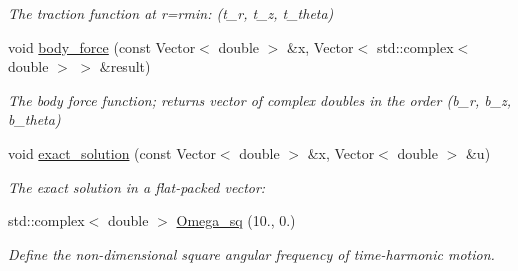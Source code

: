 \begin{DoxyCompactItemize}
\begin{DoxyCompactList}\small\item\em The traction function at r=rmin\+: (t\+\_\+r, t\+\_\+z, t\+\_\+theta) \end{DoxyCompactList}\item 
void \hyperlink{namespaceGlobal__Parameters_a8d30973505eeb753023936398bce5bcc}{body\+\_\+force} (const Vector$<$ double $>$ \&x, Vector$<$ std\+::complex$<$ double $>$ $>$ \&result)
\begin{DoxyCompactList}\small\item\em The body force function; returns vector of complex doubles in the order (b\+\_\+r, b\+\_\+z, b\+\_\+theta) \end{DoxyCompactList}\item 
void \hyperlink{namespaceGlobal__Parameters_a6e53a9e4370e8719e9091eff6b6a0c01}{exact\+\_\+solution} (const Vector$<$ double $>$ \&x, Vector$<$ double $>$ \&u)
\begin{DoxyCompactList}\small\item\em The exact solution in a flat-\/packed vector\+: \end{DoxyCompactList}\item 
std\+::complex$<$ double $>$ \hyperlink{namespaceGlobal__Parameters_acaf0a15a236b8a1af4a4c604b70a63ac}{Omega\+\_\+sq} (10., 0.)
\begin{DoxyCompactList}\small\item\em Define the non-\/dimensional square angular frequency of time-\/harmonic motion. \end{DoxyCompactList}\end{DoxyCompactItemize}

